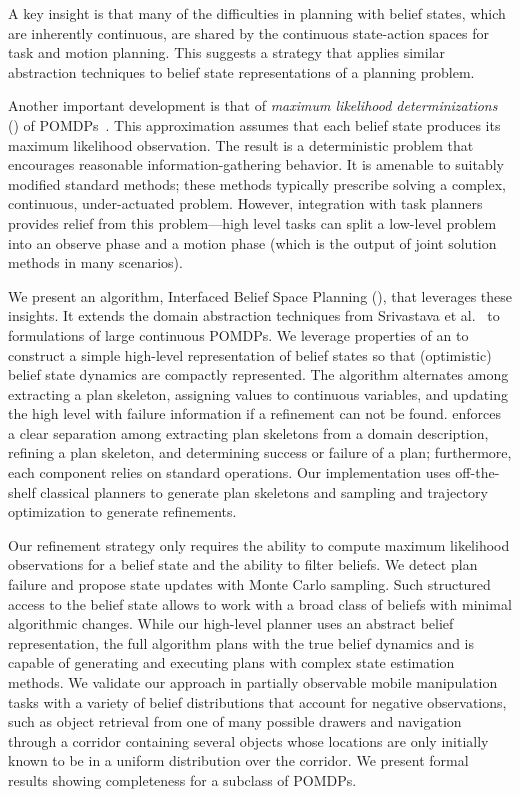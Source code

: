 A key insight is that many of the difficulties in planning with belief
states, which are inherently continuous, are shared by the continuous
state-action spaces for task and motion planning. This suggests a
strategy that applies similar abstraction techniques to belief state
representations of a planning problem.

Another important development is that of \emph{maximum
likelihood determinizations} (\mld) of
POMDPs~\cite{platt2010belief}. This approximation assumes that each
belief state produces its maximum likelihood observation. The result
is a deterministic problem that encourages reasonable information-gathering
behavior. It is amenable to suitably modified standard
methods; these methods typically prescribe solving a complex,
continuous, under-actuated problem. However, integration with task
planners provides relief from this problem---high level tasks can
split a low-level problem into an observe phase and a motion phase
(which is the output of joint solution methods in many scenarios).

We present an algorithm, Interfaced Belief Space Planning (\ibsp),
that leverages these insights. It extends the domain abstraction techniques from
Srivastava et al.~\cite{srivastava2014combined} to \mld{} formulations of large continuous
POMDPs. We leverage properties of an \mld{} to construct a simple high-level
representation of belief states so that (optimistic) belief
state dynamics are compactly represented. The algorithm alternates
among extracting a plan skeleton, assigning values to continuous
variables, and updating the high level with failure information if a
refinement can not be found.
\ibsp{} enforces a clear separation among extracting plan skeletons
from a domain description, refining a plan skeleton, and determining
success or failure of a plan; furthermore, each component relies on
standard operations. Our implementation uses off-the-shelf classical
planners to generate plan skeletons and sampling and trajectory
optimization to generate refinements. 

Our refinement strategy only requires the ability to compute maximum
likelihood observations for a belief state and the ability to filter
beliefs. We detect plan failure and propose state updates with Monte Carlo
sampling. Such structured access to the belief state allows \ibsp{} to work with a broad class
of beliefs with minimal algorithmic changes. While our high-level
planner uses an abstract belief representation, the full algorithm
plans with the true belief dynamics and is capable of generating and executing plans
with complex state estimation methods. We validate our approach in
partially observable mobile manipulation tasks with a variety of
belief distributions that account for negative observations, such as object retrieval from
one of many possible drawers and navigation through a corridor containing several objects
whose locations are only initially known to be in a uniform distribution over the corridor. We
present formal results showing completeness for a subclass of POMDPs.


